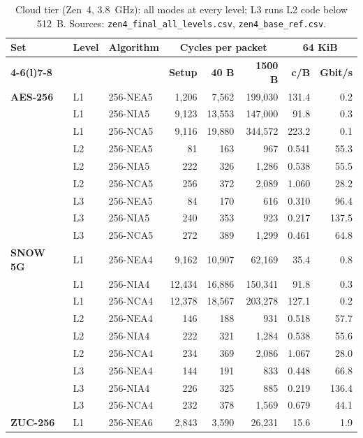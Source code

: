 \begin{table}[!htbp]
\centering
\caption{Cloud tier (Zen~4, 3.8~GHz): all modes at every level; L3 runs L2 code below 512~B. Sources: \texttt{zen4\_final\_all\_levels.csv}, \texttt{zen4\_base\_ref.csv}.}
\label{tab:s-zen4}
\footnotesize
\begin{tabular}{@{}>{\bfseries}l l l r r r r r@{}}
\toprule
\textbf{Set} & \textbf{Level} & \textbf{Algorithm} & \multicolumn{3}{c}{\textbf{Cycles per packet}} & \multicolumn{2}{c}{\textbf{64 KiB}} \\
\cmidrule(lr){4-6}\cmidrule(l){7-8}
& & & \textbf{Setup} & \textbf{40 B} & \textbf{1500 B} & \textbf{c/B} & \textbf{Gbit/s} \\
\midrule
AES-256 & L1 & 256-NEA5 & 1{,}206 & 7{,}562 & 199{,}030 & 131.4 & 0.2 \\
 & L1 & 256-NIA5 & 9{,}123 & 13{,}553 & 147{,}000 & 91.8 & 0.3 \\
 & L1 & 256-NCA5 & 9{,}116 & 19{,}880 & 344{,}572 & 223.2 & 0.1 \\
 & L2 & 256-NEA5 & 81 & 163 & 967 & 0.541 & 55.3 \\
 & L2 & 256-NIA5 & 222 & 326 & 1{,}286 & 0.538 & 55.5 \\
 & L2 & 256-NCA5 & 256 & 372 & 2{,}089 & 1.060 & 28.2 \\
 & L3 & 256-NEA5 & 84 & 170 & 616 & 0.310 & 96.4 \\
 & L3 & 256-NIA5 & 240 & 353 & 923 & 0.217 & 137.5 \\
 & L3 & 256-NCA5 & 272 & 389 & 1{,}299 & 0.461 & 64.8 \\
\midrule
SNOW 5G & L1 & 256-NEA4 & 9{,}162 & 10{,}907 & 62{,}169 & 35.4 & 0.8 \\
 & L1 & 256-NIA4 & 12{,}434 & 16{,}886 & 150{,}341 & 91.8 & 0.3 \\
 & L1 & 256-NCA4 & 12{,}378 & 18{,}567 & 203{,}278 & 127.1 & 0.2 \\
 & L2 & 256-NEA4 & 146 & 188 & 931 & 0.518 & 57.7 \\
 & L2 & 256-NIA4 & 222 & 321 & 1{,}284 & 0.538 & 55.6 \\
 & L2 & 256-NCA4 & 234 & 369 & 2{,}086 & 1.067 & 28.0 \\
 & L3 & 256-NEA4 & 144 & 191 & 833 & 0.448 & 66.8 \\
 & L3 & 256-NIA4 & 226 & 325 & 885 & 0.219 & 136.4 \\
 & L3 & 256-NCA4 & 232 & 378 & 1{,}569 & 0.679 & 44.1 \\
\midrule
ZUC-256 & L1 & 256-NEA6 & 2{,}843 & 3{,}590 & 26{,}231 & 15.6 & 1.9 \\

\end{tabular}
\end{table}
